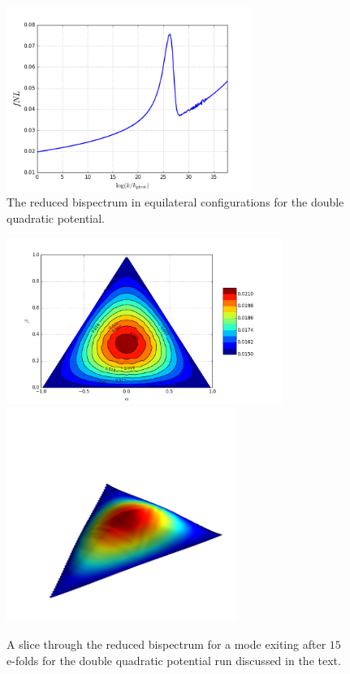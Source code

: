 \documentclass[10pt,
amsmath,amssymb,
aps,prd,nofootinbib,eqsecnum,a4paper]{revtex4}
\begin{document}
\begin{figure}
\centering
\includegraphics[width=8cm]{BiEq}
\caption{The reduced bispectrum in equilateral configurations for the double quadratic potential.\label{eqi}}
\end{figure}

\begin{figure}
\centering
\includegraphics[width=9cm]{alpBetEq3} \hspace{-1cm}
\includegraphics[width=7.5cm]{alpBetMay}
\caption{A slice through the reduced bispectrum for a mode exiting after $15$ e-folds for the double quadratic potential run discussed in the text. \label{alpbet}}
\end{figure}
\end{document}
